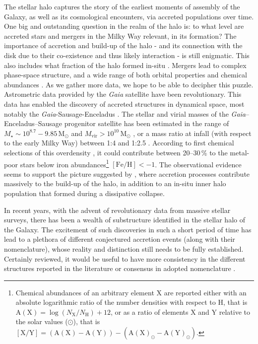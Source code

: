 \documentclass[fleqn,usenatbib]{mnras}
\newcommand{\Msol}{\,\mathrm{M_\odot}} %
\newcommand{\Gaia}{\textit{Gaia}\xspace} %
\begin{document}
The stellar halo captures the story of the earliest moments of assembly of the Galaxy, as well as its cosmological encounters, via accreted populations over time. One big and outstanding question in the realm of the halo is: to what level are accreted stars and mergers in the Milky Way relevant, in its formation? 
The importance of accretion and build-up of the halo - and its connection with the disk due to their co-existence and thus likely interaction - is still enigmatic. This also includes what fraction of the halo formed in-situ \citep{BlandHawthorn_Gerhard2016}. Mergers lead to complex phase-space structure, and a wide range of both orbital properties and chemical abundances \citep[e.g.][]{Amorisco2017, JeanBptiste2017, Monachesi2019, Koppelman2020b}. As we gather more data, we hope to be able to decipher this puzzle. Astrometric data provided by the \Gaia satellite \citep{Brown2016} have been revolutionary. This data has enabled the discovery of accreted structures in dynamical space, most notably the \Gaia-Sausage-Enceladus \citep[GSE, see e.g.][]{Belokurov2018, Helmi2018, Helmi2020}. The stellar and virial masses of the \Gaia–Enceladus–Sausage progenitor satellite has been estimated in the range of $M_\star \sim 10^8.7-9.85\Msol$ \citep{Feuillet2020,Naidu2021} and $M_\text{vir} > 10^{10}\Msol$ \citep{Belokurov2018}, or a mass ratio at infall (with respect to the early Milky Way) between 1:4 and 1:2.5 \citep{Helmi2018,Naidu2021}. According to first chemical selections of this overdensity \citep{Das2020}, it could contribute between 20--30\,\% to the metal-poor stars below iron abundances\footnote{Chemical abundances of an arbitrary element X are reported either with an absolute logarithmic ratio of the number densities with respect to H, that is $\mathrm{A(X)} = \log \left(N_\mathrm{X}/N_\mathrm{H} \right) + 12$, or as a ratio of elements X and Y relative to the solar values ($\odot$), that is $\mathrm{[X/Y]} = \left( \mathrm{A(X)} -\mathrm{ A(Y)} \right) - \left( \mathrm{A(X)}_\odot -\mathrm{A(Y)}_\odot \right)$.} $\mathrm{[Fe/H]} < -1$. The observational evidence \citep[for reviews see][]{Nissen2018, Helmi2020} seems to support the picture suggested by \citet{Searle1978}, where accretion processes contribute massively to the build-up of the halo, in addition to an in-situ inner halo population that formed during a dissipative collapse. 

In recent years, with the advent of revolutionary data from massive stellar surveys, there has been a wealth of substructure identified in the stellar halo of the Galaxy. The excitement of such discoveries in such a short period of time has lead to a plethora of different conjectured accretion events (along with their nomenclature), whose reality and distinction still needs to be fully established. Certainly reviewed, it would be useful to have more consistency in the different structures reported in the literature \citep{Helmi2020} or consensus in adopted nomenclature \citep[see e.g][]{An2021b}. 
\end{document}
